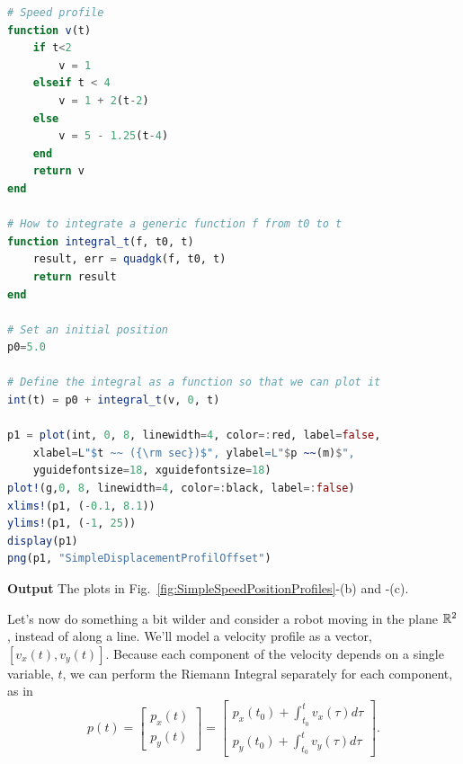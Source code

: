 \begin{lstlisting}[language=Julia,style=mystyle]
# Speed profile
function v(t)
    if t<2
        v = 1
    elseif t < 4
        v = 1 + 2(t-2)
    else
        v = 5 - 1.25(t-4)
    end     
    return v
end

# How to integrate a generic function f from t0 to t
function integral_t(f, t0, t)
    result, err = quadgk(f, t0, t)
    return result
end

# Set an initial position
p0=5.0

# Define the integral as a function so that we can plot it
int(t) = p0 + integral_t(v, 0, t)

p1 = plot(int, 0, 8, linewidth=4, color=:red, label=false, 
    xlabel=L"$t ~~ ({\rm sec})$", ylabel=L"$p ~~(m)$",
    yguidefontsize=18, xguidefontsize=18)
plot!(g,0, 8, linewidth=4, color=:black, label=:false)
xlims!(p1, (-0.1, 8.1))
ylims!(p1, (-1, 25))
display(p1)
png(p1, "SimpleDisplacementProfilOffset")

\end{lstlisting}
\textbf{Output} 
The plots in Fig.~\ref{fig:SimpleSpeedPositionProfiles}-(b) and -(c).


\bigskip


Let's now do something a bit wilder and consider a robot moving in the plane $\mathbb R^2$, instead of along a line. We'll model a velocity profile as a vector, $[v_x(t), v_y(t)]$. Because each component of the velocity depends on a single variable, $t$, we can perform the Riemann Integral separately for each component, as in 
\begin{equation}
    \label{eq:IntegrateSpeed4PositionR2}
    p(t) = \begin{bmatrix} p_x(t) \\ p_y(t) \end{bmatrix} = 
    \begin{bmatrix} p_x(t_0) +  \int_{t_0}^t v_x(\tau) d\tau\\[1em]  
    p_y(t_0) + \int_{t_0}^t v_y(\tau) d\tau\end{bmatrix}.
\end{equation}

